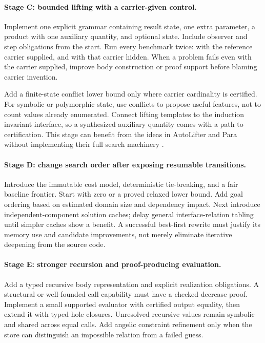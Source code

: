 \paragraph{Stage C: bounded lifting with a carrier-given control.}
Implement one explicit grammar containing result state, one extra parameter,
a product with one auxiliary quantity, and optional state. Include observer
and step obligations from the start. Run every benchmark twice: with the
reference carrier supplied, and with that carrier hidden. When a problem
fails even with the carrier supplied, improve body construction or proof
support before blaming carrier invention.

Add a finite-state conflict lower bound only where carrier cardinality is
certified. For symbolic or polymorphic state, use conflicts to propose useful
features, not to count values already enumerated. Connect lifting templates
to the induction invariant interface, so a synthesized auxiliary quantity
comes with a path to certification. This stage can benefit from the ideas in
AutoLifter and Para without implementing their full search machinery
\cite{autolifter,para}.

\paragraph{Stage D: change search order after exposing resumable transitions.}
Introduce the immutable cost model, deterministic tie-breaking, and a fair
baseline frontier. Start with zero or a proved relaxed lower bound. Add goal
ordering based on estimated domain size and dependency impact. Next introduce
independent-component solution caches; delay general interface-relation
tabling until simpler caches show a benefit. A successful best-first rewrite
must justify its memory use and candidate improvements, not merely eliminate
iterative deepening from the source code.

\paragraph{Stage E: stronger recursion and proof-producing evaluation.}
Add a typed recursive body representation and explicit realization obligations.
A structural or well-founded call capability must have a checked decrease
proof. Implement a small supported evaluator with certified output equality,
then extend it with typed hole closures. Unresolved recursive values remain
symbolic and shared across equal calls. Add angelic constraint refinement only
when the store can distinguish an impossible relation from a failed guess.

